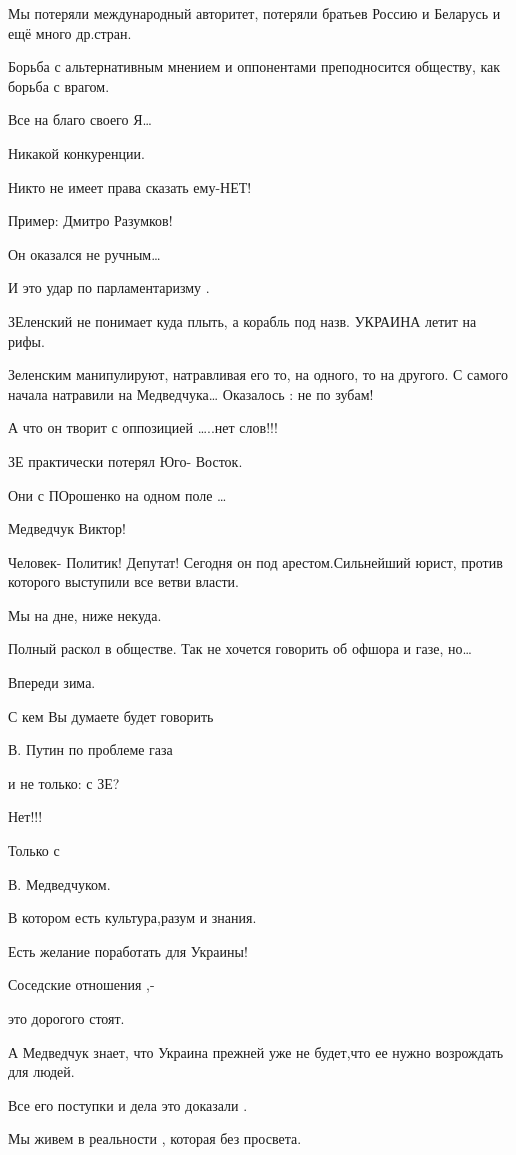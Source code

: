 Мы потеряли международный авторитет, потеряли братьев Россию и Беларусь и ещё
много др.стран.

Борьба с альтернативным мнением и оппонентами преподносится обществу, как
борьба с врагом.  

Все на благо своего Я…

Никакой конкуренции. 

Никто не имеет  права сказать ему-НЕТ!

Пример: Дмитро Разумков!

Он оказался не ручным…

И это удар по парламентаризму .

ЗЕленский не понимает куда  плыть, а корабль под назв. УКРАИНА летит на рифы.

 Зеленским манипулируют, натравливая его то, на одного, то на другого. С самого
 начала натравили на Медведчука… Оказалось  : не по зубам!

А что он творит с оппозицией …..нет слов!!!

ЗЕ практически потерял Юго- Восток. 

Они с ПОрошенко  на одном поле …

Медведчук Виктор! 

Человек-  Политик! Депутат! Сегодня он под арестом.Сильнейший юрист, против
которого выступили все ветви власти.

 Мы на дне, ниже некуда. 

Полный раскол в обществе.  Так не хочется говорить об офшора и газе, но…

Впереди зима. 

С кем Вы думаете будет говорить 

В. Путин по проблеме газа 

и не только: с ЗЕ? 

Нет!!! 

Только с 

В. Медведчуком. 

В котором есть  культура,разум и знания.  

Есть желание поработать для Украины!

Соседские отношения ,-

это дорогого стоят. 

А Медведчук знает, что Украина прежней уже не будет,что ее нужно возрождать для
людей.

Все его поступки и дела это доказали .

 Мы живем в реальности , которая без просвета.

